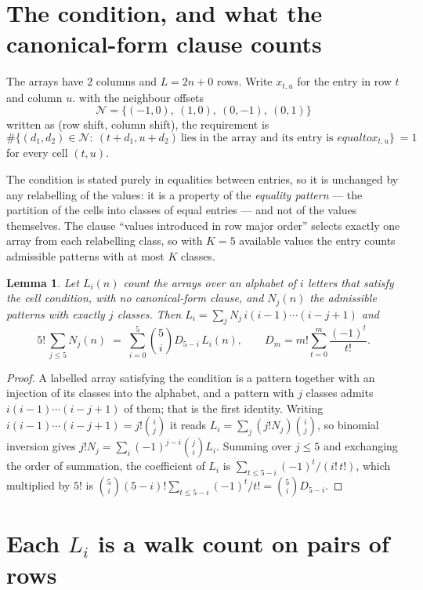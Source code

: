 \documentclass[11pt,a4paper]{article}
\theoremstyle{plain}
\newtheorem{lemma}[theorem]{Lemma}
\theoremstyle{definition}
\begin{document}
\section{The condition, and what the canonical-form clause counts}

The arrays have $2$ columns and $L=2n+0$ rows. Write $x_{t,u}$ for the entry in
row $t$ and column $u$. with the neighbour offsets
\[
\mathcal N=\{(-1,0),\ (1,0),\ (0,-1),\ (0,1)\}
\]
written as (row shift, column shift), the requirement is
\begin{equation}\label{eq:loc}
\#\bigl\{(d_1,d_2)\in\mathcal N:\ (t+d_1,u+d_2)\ \text{lies in the array and its entry is }
equal to x_{t,u}\bigr\}\ =1
\end{equation}
for every cell $(t,u)$.

The condition is stated purely in equalities between entries, so it is unchanged by any
relabelling of the values: it is a property of the \emph{equality pattern} --- the partition
of the cells into classes of equal entries --- and not of the values themselves. The clause
``values introduced in row major order'' selects exactly one array from each relabelling
class, so with $K=5$ available values the entry counts admissible patterns with at most $K$
classes.

\begin{lemma}\label{lem:inv}
Let $L_i(n)$ count the arrays over an alphabet of $i$ letters that satisfy the cell
condition, with no canonical-form clause, and $N_j(n)$ the admissible patterns with exactly
$j$ classes. Then $L_i=\sum_j N_j\,i(i-1)\cdots(i-j+1)$ and
\[
5!\,\sum_{j\le 5}N_j(n)\;=\;\sum_{i=0}^{5}\binom{5}{i}D_{5-i}\,L_i(n),
\qquad D_m=m!\sum_{t=0}^{m}\frac{(-1)^t}{t!} .
\]
\end{lemma}

\begin{proof}
A labelled array satisfying the condition is a pattern together with an injection of its
classes into the alphabet, and a pattern with $j$ classes admits $i(i-1)\cdots(i-j+1)$ of
them; that is the first identity. Writing $i(i-1)\cdots(i-j+1)=j!\binom{i}{j}$ it reads
$L_i=\sum_j(j!N_j)\binom{i}{j}$, so binomial inversion gives
$j!N_j=\sum_i(-1)^{j-i}\binom{j}{i}L_i$. Summing over $j\le5$ and exchanging the
order of summation, the coefficient of $L_i$ is
$\sum_{t\le5-i}(-1)^t/(i!\,t!)$, which multiplied by $5!$ is
$\binom{5}{i}(5-i)!\sum_{t\le5-i}(-1)^t/t!=\binom{5}{i}D_{5-i}$.
\end{proof}

\section{Each $L_i$ is a walk count on pairs of rows}
\end{document}
